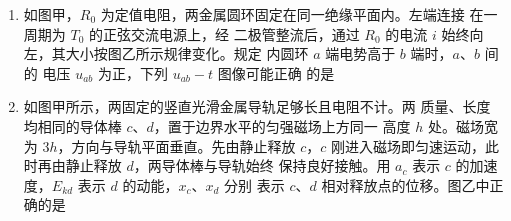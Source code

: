 \begin{enumerate}
\pfourchoices
{}
{}
{}
{}


\item 
{}
如图甲，$ R_{0} $ 为定值电阻，两金属圆环固定在同一绝缘平面内。左端连接
在一周期为 $ T_{0} $ 的正弦交流电源上，经
二极管整流后，通过 $ R_{0} $ 的电流 $ i $ 始终向
左，其大小按图乙所示规律变化。规定
内圆环 $ a $ 端电势高于 $ b $ 端时，$ a $、$ b $ 间的
电压 $ u_{ab} $ 为正，下列 $ u_{ab}-t $ 图像可能正确
的是  
\begin{figure}[h!]
\centering
\begin{subfigure}{0.4\linewidth}
\centering
 
\caption{}\label{}
\end{subfigure}
\begin{subfigure}{0.4\linewidth}
\centering
 
\caption{}\label{}
\end{subfigure}
\end{figure}

\pfourchoices
{}
{}
{}
{}






\item 
{}
如图甲所示，两固定的竖直光滑金属导轨足够长且电阻不计。两
质量、长度均相同的导体棒 $ c $、$ d $，置于边界水平的匀强磁场上方同一
高度 $ h $ 处。磁场宽为 $ 3 h $，方向与导轨平面垂直。先由静止释放 $ c $，$ c $
刚进入磁场即匀速运动，此时再由静止释放 $ d $，两导体棒与导轨始终
保持良好接触。用 $ a_c $ 表示 $ c $ 的加速度，$ E_{kd} $ 表示 $ d $ 的动能，$ x_c $、$ x_d $ 分别
表示 $ c $、$ d $ 相对释放点的位移。图乙中正确的是  
\begin{figure}[h!]
\centering

\end{figure}


\pfourchoices
{}
{}
{}
{}



\end{enumerate}

